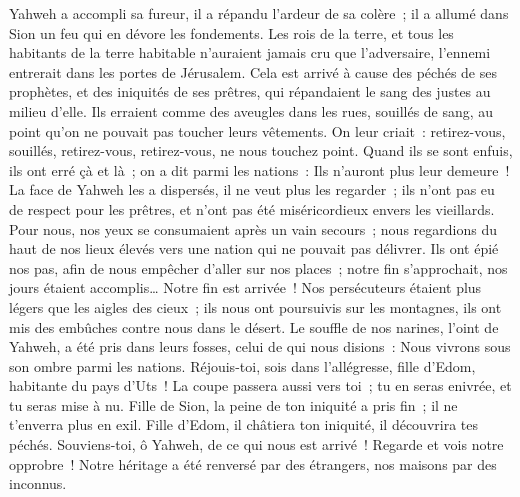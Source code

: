 \begin{multicols}{2}
 Yahweh a accompli sa fureur, il a répandu l'ardeur de sa colère~; il a allumé dans Sion un feu qui en dévore les fondements.
 Les rois de la terre, et tous les habitants de la terre habitable n'auraient jamais cru que l'adversaire, l'ennemi entrerait dans les portes de Jérusalem.
 Cela est arrivé à cause des péchés de ses prophètes, et des iniquités de ses prêtres, qui répandaient le sang des justes au milieu d'elle.
 Ils erraient comme des aveugles dans les rues, souillés de sang, au point qu'on ne pouvait pas toucher leurs vêtements.
 On leur criait~: retirez-vous, souillés, retirez-vous, retirez-vous, ne nous touchez point. Quand ils se sont enfuis, ils ont erré çà et là~; on a dit parmi les nations~: Ils n'auront plus leur demeure~!
 La face de Yahweh les a dispersés, il ne veut plus les regarder~; ils n'ont pas eu de respect pour les prêtres, et n'ont pas été miséricordieux envers les vieillards.
 Pour nous, nos yeux se consumaient après un vain secours~; nous regardions du haut de nos lieux élevés vers une nation qui ne pouvait pas délivrer.
 Ils ont épié nos pas, afin de nous empêcher d'aller sur nos places~; notre fin s'approchait, nos jours étaient accomplis… Notre fin est arrivée~!
 Nos persécuteurs étaient plus légers que les aigles des cieux~; ils nous ont poursuivis sur les montagnes, ils ont mis des embûches contre nous dans le désert.
 Le souffle de nos narines, l'oint de Yahweh, a été pris dans leurs fosses, celui de qui nous disions~: Nous vivrons sous son ombre parmi les nations.
 Réjouis-toi, sois dans l'allégresse, fille d'Edom, habitante du pays d'Uts~! La coupe passera aussi vers toi~; tu en seras enivrée, et tu seras mise à nu.
 Fille de Sion, la peine de ton iniquité a pris fin~; il ne t'enverra plus en exil. Fille d'Edom, il châtiera ton iniquité, il découvrira tes péchés.
\VerseOne{}Souviens-toi, ô Yahweh, de ce qui nous est arrivé~! Regarde et vois notre opprobre~!
Notre héritage a été renversé par des étrangers, nos maisons par des inconnus.

\end{multicols}
